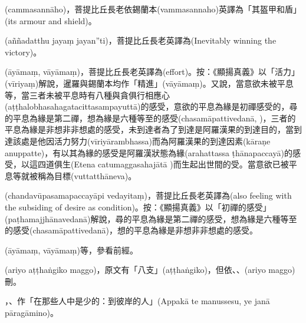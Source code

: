 \startitemgroup[noteitems]
\item{}(cammasannāho)，菩提比丘長老依錫蘭本(vammasannaho)英譯為「其盔甲和盾」(its armour and shield)。
\stopitemgroup

\startitemgroup[noteitems]
\item{}(aññadatthu jayaṃ jayan”ti)，菩提比丘長老英譯為(Inevitably winning the victory)。
\stopitemgroup

\startitemgroup[noteitems]
\item{}(āyāmaṃ, vāyāmaṃ)，菩提比丘長老英譯為(effort)。按：《顯揚真義》以「活力」(vīriyaṃ)解說，暹羅與錫蘭本均作「精進」(vāyāmaṃ)。又說，當意欲未被平息等，當三者未被平息時有八種與貪俱行相應心(aṭṭhalobhasahagatacittasampayuttā)的感受，意欲的平息為緣是初禪感受的，尋的平息為緣是第二禪，想為緣是六種等至的感受(chasamāpattivedanā, )，三者的平息為緣是非想非非想處的感受，未到達者為了到達是阿羅漢果的到達目的，當到達該處是他因活力努力(vīriyārambhassa)而為阿羅漢果的到達因素(kāraṇe anuppatte)，有以其為緣的感受是阿羅漢狀態為緣(arahattassa ṭhānapaccayā)的感受，以這四道俱生(Etena catumaggasahajātā )而生起出世間的受。當意欲已被平息等就被稱為目標(vuttatthāneva)。
\stopitemgroup

\startitemgroup[noteitems]
\item{}(chandavūpasamapaccayāpi vedayitaṃ)，菩提比丘長老英譯為(also feeling with the subsiding of desire as condition)。按：《顯揚真義》以「初禪的感受」(paṭhamajjhānavedanā)解說，尋的平息為緣是第二禪的感受，想為緣是六種等至的感受(chasamāpattivedanā)，想的平息為緣是非想非非想處的感受。
\stopitemgroup

\startitemgroup[noteitems]
\item{}(āyāmaṃ, vāyāmaṃ)等，參看前經。
\stopitemgroup

\startitemgroup[noteitems]
\item{}(ariyo aṭṭhaṅgiko maggo)，原文有「八支」(aṭṭhaṅgiko)，但依、、(ariyo maggo)刪。
\stopitemgroup

\startitemgroup[noteitems]
\item{}，、作「在那些人中是少的：到彼岸的人」(Appakā te manussesu, ye janā pāragāmino)。
\stopitemgroup

